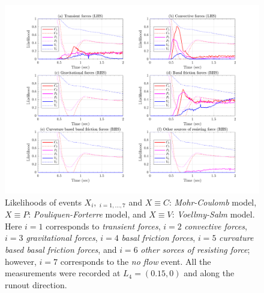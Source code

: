 \documentclass{article}
\begin{document}
\begin{figure}[H]
        \centering
        \includegraphics[width=1\textwidth]{InclinedPlane/LocalRecords/DominancePrX_L4.png}
        \caption{Likelihoods of events $X_i, \ _{i=1,...,7}$ and $X \equiv C$: \emph{Mohr-Coulomb} model, $X \equiv P$: \emph{Pouliquen-Forterre} model, and $X \equiv V$: \emph{Voellmy-Salm} model. Here $i=1$ corresponds to \emph{transient forces}, $i=2$ \emph{convective forces}, $i=3$ \emph{gravitational forces}, $i=4$ \emph{basal friction forces}, $i=5$ \emph{curvature based basal friction forces}, and $i=6$ \emph{other sorces of resisting force}; however, $i=7$ corresponds to the \emph{no flow} event. All the measurements were recorded at $L_4=(0.15,0)$ and along the runout direction.}
        \label{fig:Ramp-FXDominance-L4}
\end{figure}
\end{document}
